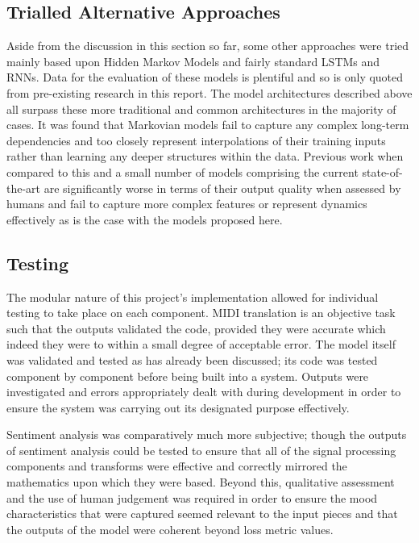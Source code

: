 \documentclass[12pt,]{article}
\begin{document}
\hypertarget{trialled-alternative-approaches}{%
\subsection{Trialled Alternative
Approaches}\label{trialled-alternative-approaches}}

Aside from the discussion in this section so far, some other approaches
were tried mainly based upon Hidden Markov Models and fairly standard
LSTMs and RNNs. Data for the evaluation of these models is plentiful and
so is only quoted from pre-existing research in this report. The model
architectures described above all surpass these more traditional and
common architectures in the majority of cases. It was found that
Markovian models fail to capture any complex long-term dependencies and
too closely represent interpolations of their training inputs rather
than learning any deeper structures within the data. Previous work when
compared to this and a small number of models comprising the current
state-of-the-art are significantly worse in terms of their output
quality when assessed by humans and fail to capture more complex
features or represent dynamics effectively as is the case with the
models proposed here.

\hypertarget{testing}{%
\subsection{Testing}\label{testing}}

The modular nature of this project's implementation allowed for
individual testing to take place on each component. MIDI translation is
an objective task such that the outputs validated the code, provided
they were accurate which indeed they were to within a small degree of
acceptable error. The model itself was validated and tested as has
already been discussed; its code was tested component by component
before being built into a system. Outputs were investigated and errors
appropriately dealt with during development in order to ensure the
system was carrying out its designated purpose effectively.

Sentiment analysis was comparatively much more subjective; though the
outputs of sentiment analysis could be tested to ensure that all of the
signal processing components and transforms were effective and correctly
mirrored the mathematics upon which they were based. Beyond this,
qualitative assessment and the use of human judgement was required in
order to ensure the mood characteristics that were captured seemed
relevant to the input pieces and that the outputs of the model were
coherent beyond loss metric values.
\end{document}
